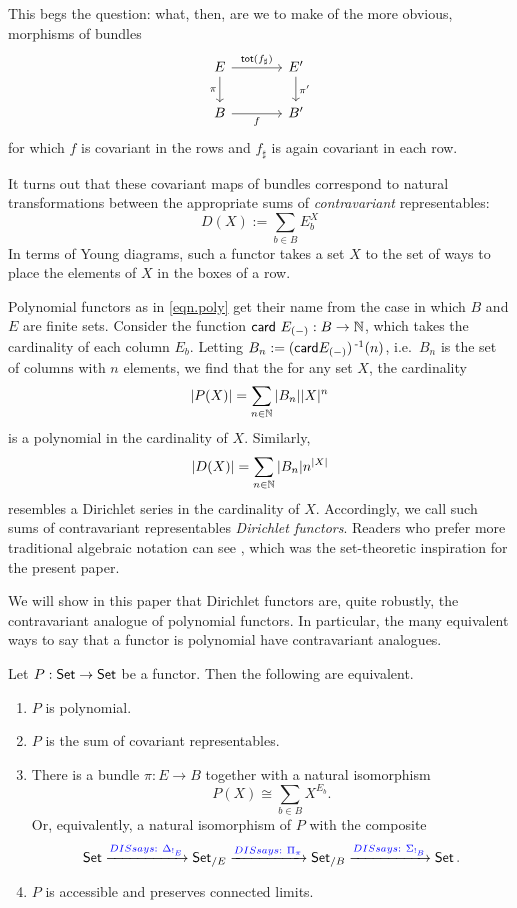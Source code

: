 This begs the question: what, then, are we to make of the more obvious,
\emph{} morphisms of bundles
\[
  \begin{tikzcd}[column sep=large]
E \arrow[r, "\term{tot}(f_{\sharp})"] \arrow[d, "\pi"'] & E' \arrow[d, "\pi'"] \\
B \arrow[r, "f"']                                       & B'                  
\end{tikzcd}
\]
for which $f$ is covariant in the rows and $f_\sharp$ is again covariant
in each row.

It turns out that these covariant maps of bundles correspond to natural
transformations between the appropriate sums of \emph{contravariant}
representables:
$$D(X) := \sum_{b \in B} E_b^X$$
In terms of Young diagrams, such a functor takes a set $X$ to the set of ways to
place the elements of $X$ in the boxes of a row.

Polynomial functors as in \eqref{eqn.poly} get their name from the case in which $B$ and $E$ are finite sets. Consider the function $\mathsf{{card}}~E_{(-)} : B \to \operatorname{\mathbb{N}}$, which takes the cardinality of each column $E_b$. Letting $B_n := (\mathsf{{card}}E_{(-)})\operatorname{^{-1}}(n)$, i.e.\ $B_n$ is the set of columns with $n$ elements,
we find that the for any set $X$, the cardinality
$$|P(X)| = \sum_{n \in \operatorname{\mathbb{N}}} |B_n||X|^n$$
is a polynomial in the cardinality of $X$. Similarly,
$$|D(X)| = \sum_{n \in \operatorname{\mathbb{N}}} |B_n|n^{|X|}$$
resembles a Dirichlet series in the cardinality of $X$. Accordingly, we call such
sums of contravariant representables \emph{Dirichlet functors}. Readers who prefer more traditional algebraic notation can see \cite{SpivakMyers}, which was the set-theoretic inspiration for the present paper.

We will show in this paper that Dirichlet functors are, quite robustly, the
contravariant analogue of polynomial functors. In particular, the many equivalent ways to
say that a functor is polynomial have contravariant analogues.
\begin{thm}[cite]\label{thm:polynomial.set.characterization}
  Let $P : \operatorname{\mathsf{{Set}}} \to \operatorname{\mathsf{{Set}}}$ be a functor. Then the following are equivalent.
  \begin{enumerate}
  \item $P$ is polynomial.
  \item $P$ is the sum of covariant representables.
  \item There is a bundle $\pi : E \to B$ together with a natural isomorphism
    $$P(X) \cong \sum_{b \in B} X^{E_b}.$$
    Or, equivalently, a natural isomorphism of $P$ with the composite
    $$\operatorname{\mathsf{{Set}}} \xrightarrow{{\color{blue} DIS says:\ \Delta_{!_E}}} \operatorname{\mathsf{{Set}}}_{/E} \xrightarrow{{\color{blue} DIS says:\ \Pi_\pi}} \operatorname{\mathsf{{Set}}}_{/B} \xrightarrow{{\color{blue} DIS says:\ \Sigma_{!_B}}} \operatorname{\mathsf{{Set}}}.$$
  \item $P$ is accessible and preserves connected limits.
  \end{enumerate}
\end{thm}

